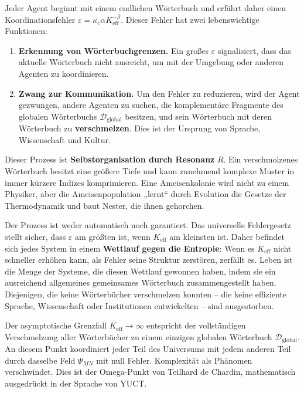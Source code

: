 \documentclass[12pt,a4paper]{article}
\newcommand{\Keff}{K_{\mathrm{eff}}}
\begin{document}
	Jeder Agent beginnt mit einem endlichen Wörterbuch und erfährt daher einen Koordinationsfehler \(\varepsilon = \kappa_c \alpha \Keff^{-\beta}\). Dieser Fehler hat zwei lebenswichtige Funktionen:
	
	\begin{enumerate}[leftmargin=*]
		\item \textbf{Erkennung von Wörterbuchgrenzen.} Ein großes \(\varepsilon\) signalisiert, dass das aktuelle Wörterbuch nicht ausreicht, um mit der Umgebung oder anderen Agenten zu koordinieren.
		\item \textbf{Zwang zur Kommunikation.} Um den Fehler zu reduzieren, wird der Agent gezwungen, andere Agenten zu suchen, die komplementäre Fragmente des globalen Wörterbuchs \(\mathcal{D}_{\text{global}}\) besitzen, und sein Wörterbuch mit deren Wörterbuch zu \textbf{verschmelzen}. Dies ist der Ursprung von Sprache, Wissenschaft und Kultur.
	\end{enumerate}
	
	Dieser Prozess ist \textbf{Selbstorganisation durch Resonanz} \(R\). Ein verschmolzenes Wörterbuch besitzt eine größere Tiefe und kann zunehmend komplexe Muster in immer kürzere Indizes komprimieren. Eine Ameisenkolonie wird nicht zu einem Physiker, aber die Ameisenpopulation „lernt“ durch Evolution die Gesetze der Thermodynamik und baut Nester, die ihnen gehorchen.
	
	Der Prozess ist weder automatisch noch garantiert. Das universelle Fehlergesetz stellt sicher, dass \(\varepsilon\) am größten ist, wenn \(\Keff\) am kleinsten ist. Daher befindet sich jedes System in einem \textbf{Wettlauf gegen die Entropie}: Wenn es \(\Keff\) nicht schneller erhöhen kann, als Fehler seine Struktur zerstören, zerfällt es. Leben ist die Menge der Systeme, die diesen Wettlauf gewonnen haben, indem sie ein ausreichend allgemeines gemeinsames Wörterbuch zusammengestellt haben. Diejenigen, die keine Wörterbücher verschmelzen konnten – die keine effiziente Sprache, Wissenschaft oder Institutionen entwickelten – sind ausgestorben.
	
	Der asymptotische Grenzfall \(\Keff \to \infty\) entspricht der vollständigen Verschmelzung aller Wörterbücher zu einem einzigen globalen Wörterbuch \(\mathcal{D}_{\text{global}}\). An diesem Punkt koordiniert jeder Teil des Universums mit jedem anderen Teil durch dasselbe Feld \(\Psi_{MN}\) mit null Fehler. Komplexität als Phänomen verschwindet. Dies ist der Omega-Punkt von Teilhard de Chardin, mathematisch ausgedrückt in der Sprache von YUCT.
	
\end{document}
